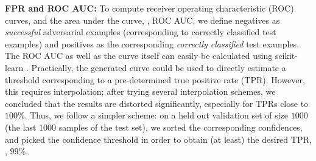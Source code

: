 \textbf{FPR and ROC AUC:}
%
To compute receiver operating characteristic (ROC) curves, and the area under the curve, \ie, ROC AUC, we define negatives as \emph{successful} adversarial examples (corresponding to correctly classified test examples) and positives as the corresponding \emph{correctly classified} test examples. The ROC AUC as well as the curve itself can easily be calculated using scikit-learn \citep{PedregosaJMLR2011}. Practically, the generated curve could be used to directly estimate a threshold corresponding to a pre-determined true positive rate (TPR). However, this requires interpolation; after trying several interpolation schemes, we concluded that the results are distorted significantly, especially for TPRs close to $100\%$. Thus, we follow a simpler scheme: on a held out validation set of size $1000$ (the last 1000 samples of the test set), we sorted the corresponding confidences, and picked the confidence threshold in order to obtain (at least) the desired TPR, \eg, $99\%$.

